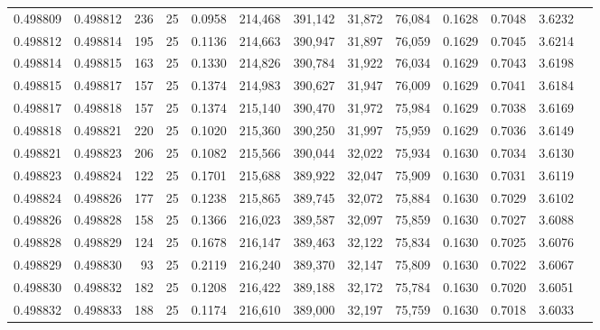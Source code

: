 \begin{tabular}{rrrrrrrrrrrrr}
0.498809 & 0.498812 & 236 &  25 &                                     0.0958 & 214,468 & 391,142 &  31,872 &  76,084 & 0.1628 & 0.7048 & 3.6232 \\
0.498812 & 0.498814 & 195 &  25 &                                     0.1136 & 214,663 & 390,947 &  31,897 &  76,059 & 0.1629 & 0.7045 & 3.6214 \\
0.498814 & 0.498815 & 163 &  25 &                                     0.1330 & 214,826 & 390,784 &  31,922 &  76,034 & 0.1629 & 0.7043 & 3.6198 \\
0.498815 & 0.498817 & 157 &  25 &                                     0.1374 & 214,983 & 390,627 &  31,947 &  76,009 & 0.1629 & 0.7041 & 3.6184 \\
0.498817 & 0.498818 & 157 &  25 &                                     0.1374 & 215,140 & 390,470 &  31,972 &  75,984 & 0.1629 & 0.7038 & 3.6169 \\
0.498818 & 0.498821 & 220 &  25 &                                     0.1020 & 215,360 & 390,250 &  31,997 &  75,959 & 0.1629 & 0.7036 & 3.6149 \\
0.498821 & 0.498823 & 206 &  25 &                                     0.1082 & 215,566 & 390,044 &  32,022 &  75,934 & 0.1630 & 0.7034 & 3.6130 \\
0.498823 & 0.498824 & 122 &  25 &                                     0.1701 & 215,688 & 389,922 &  32,047 &  75,909 & 0.1630 & 0.7031 & 3.6119 \\
0.498824 & 0.498826 & 177 &  25 &                                     0.1238 & 215,865 & 389,745 &  32,072 &  75,884 & 0.1630 & 0.7029 & 3.6102 \\
0.498826 & 0.498828 & 158 &  25 &                                     0.1366 & 216,023 & 389,587 &  32,097 &  75,859 & 0.1630 & 0.7027 & 3.6088 \\
0.498828 & 0.498829 & 124 &  25 &                                     0.1678 & 216,147 & 389,463 &  32,122 &  75,834 & 0.1630 & 0.7025 & 3.6076 \\
0.498829 & 0.498830 &  93 &  25 &                                     0.2119 & 216,240 & 389,370 &  32,147 &  75,809 & 0.1630 & 0.7022 & 3.6067 \\
0.498830 & 0.498832 & 182 &  25 &                                     0.1208 & 216,422 & 389,188 &  32,172 &  75,784 & 0.1630 & 0.7020 & 3.6051 \\
0.498832 & 0.498833 & 188 &  25 &                                     0.1174 & 216,610 & 389,000 &  32,197 &  75,759 & 0.1630 & 0.7018 & 3.6033 \\

\end{tabular}
